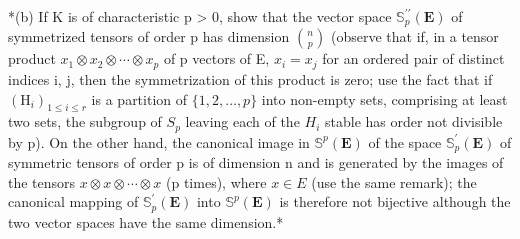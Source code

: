 *(b) If K is of characteristic p \textgreater{} 0, show that the vector space \(\mathbb{S}_{p}^{\prime\prime}(\mathbf{E})\) of symmetrized tensors of order p has dimension \(\binom{n}{p}\) (observe that if, in a tensor product \(x_{1} \otimes x_{2} \otimes \cdots \otimes x_{p}\) of p vectors of E, \(x_{i} = x_{j}\) for an ordered pair of distinct indices i, j, then the symmetrization of this product is zero; use the fact that if \((\mathrm{H}_{i})_{1 \leqslant i \leqslant r}\) is a partition of \(\{1, 2, \ldots, p\}\) into non-empty sets, comprising at least two sets, the subgroup of \(S_{p}\) leaving each of the \(H_{i}\) stable has order not divisible by p). On the other hand, the canonical image in \(\mathbb{S}^{p}(\mathbf{E})\) of the space \(\mathbb{S}_{p}^{\prime}(\mathbf{E})\) of symmetric tensors of order p is of dimension n and is generated by the images of the tensors \(x \otimes x \otimes \cdots \otimes x\) (p times), where \(x \in E\) (use the same remark); the canonical mapping of \(\mathbb{S}_{p}^{\prime}(\mathbf{E})\) into \(\mathbb{S}^{p}(\mathbf{E})\) is therefore not bijective although the two vector spaces have the same dimension.*

